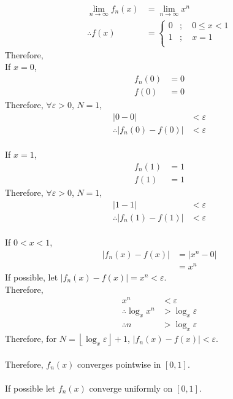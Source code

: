 \documentclass[fleqn, a4paper, 12pt, twoside]{article}
\theoremstyle{definition}
\theoremstyle{theorem}
\begin{document}
{\begin{solution}
	\begin{align*}
		\lim\limits_{n \to \infty} f_n(x) & = \lim\limits_{n \to \infty} x^n \\
		\therefore f(x)                   & =
			\begin{cases}
				0 & ;\quad 0 \le x < 1 \\
				1 & ;\quad x = 1       \\
			\end{cases}
	\end{align*}
	Therefore,\\
	If $x = 0$,
	\begin{align*}
		f_n(0) &= 0\\
		f(0) &= 0
	\end{align*}
	Therefore, $\forall \varepsilon > 0$, $N = 1$,
	\begin{align*}
		|0 - 0| &< \varepsilon\\
		\therefore |f_n(0) - f(0)| &< \varepsilon
	\end{align*}
	~\\
	If $x = 1$,
	\begin{align*}
		f_n(1) &= 1\\
		f(1) &= 1
	\end{align*}
	Therefore, $\forall \varepsilon > 0$, $N = 1$,
	\begin{align*}
		|1 - 1| &< \varepsilon\\
		\therefore |f_n(1) - f(1)| &< \varepsilon
	\end{align*}
	~\\
	If $0 < x < 1$,
	\begin{align*}
		|f_n(x) - f(x)| &= |x^n - 0|\\
		&= x^n
	\end{align*}
	If possible, let $|f_n(x) - f(x)| = x^n < \varepsilon$.\\
	Therefore,
	\begin{align*}
		x^n &< \varepsilon\\
		\therefore \log_{x} x^n &> \log_{x} \varepsilon\\
		\therefore n &> \log_{x} \varepsilon
	\end{align*}
	Therefore, for $N = \left\lfloor \log_{x} \varepsilon \right\rfloor + 1$, $|f_n(x) - f(x)| < \varepsilon$.\\
	~\\
	Therefore, $f_n(x)$ converges pointwise in $[0,1]$.\\
	~\\
	If possible let $f_n(x)$ converge uniformly on $[0,1]$.\\

\end{solution}}
\end{document}
